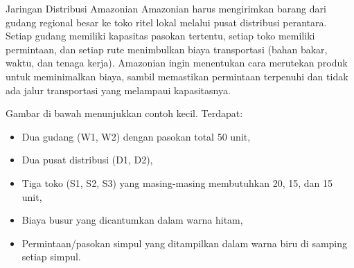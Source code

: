 \vspace{0.5em}
\begin{example}{Jaringan Distribusi Amazonian}{}
Amazonian harus mengirimkan barang dari gudang regional besar ke toko ritel lokal melalui pusat distribusi perantara. Setiap gudang memiliki kapasitas pasokan tertentu, setiap toko memiliki permintaan, dan setiap rute menimbulkan biaya transportasi (bahan bakar, waktu, dan tenaga kerja). Amazonian ingin menentukan cara merutekan produk untuk meminimalkan biaya, sambil memastikan permintaan terpenuhi dan tidak ada jalur transportasi yang melampaui kapasitasnya.

\vspace{0.5em}
Gambar di bawah menunjukkan contoh kecil. Terdapat:
\begin{itemize}
\item Dua gudang (W1, W2) dengan pasokan total 50 unit,
\item Dua pusat distribusi (D1, D2),
\item Tiga toko (S1, S2, S3) yang masing-masing membutuhkan 20, 15, dan 15 unit,
\item Biaya busur yang dicantumkan dalam warna hitam,
\item Permintaan/pasokan simpul yang ditampilkan dalam warna biru di samping setiap simpul.
\end{itemize}

\vspace{-1em}
\begin{center}
\end{center}
\end{example}

